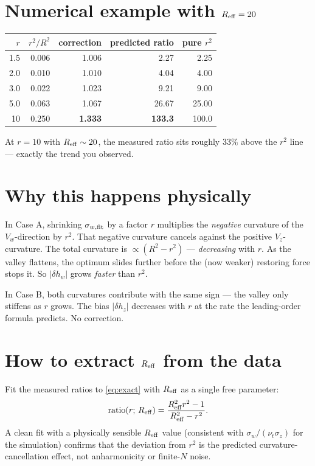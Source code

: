 \documentclass[11pt]{article}
\begin{document}
\section*{Numerical example with $R_{\rm eff}=20$}

\begin{center}
\begin{tabular}{rrrrr}
\toprule
$r$ & $r^2/R^2$ & correction & predicted ratio & pure $r^2$ \\
\midrule
1.5 & 0.006 & 1.006 &   2.27 &   2.25 \\
2.0 & 0.010 & 1.010 &   4.04 &   4.00 \\
3.0 & 0.022 & 1.023 &   9.21 &   9.00 \\
5.0 & 0.063 & 1.067 &  26.67 &  25.00 \\
10  & 0.250 & \textbf{1.333} & \textbf{133.3} & 100.0 \\
\bottomrule
\end{tabular}
\end{center}

At $r=10$ with $R_{\rm eff}\sim 20$, the measured ratio sits roughly $33\%$ above the
$r^2$ line — exactly the trend you observed.

\section*{Why this happens physically}

In Case A, shrinking $\sigma_{w,\rm fit}$ by a factor $r$ multiplies the
\emph{negative} curvature of the $V_w$-direction by $r^2$. That negative curvature
cancels against the positive $V_z$-curvature. The total curvature is
$\propto(R^2 - r^2)$ — \emph{decreasing} with $r$. As the valley flattens, the
optimum slides further before the (now weaker) restoring force stops it. So
$|\delta h_w|$ grows \emph{faster} than $r^2$.

In Case B, both curvatures contribute with the same sign — the valley only stiffens
as $r$ grows. The bias $|\delta h_z|$ decreases with $r$ at the rate the leading-order
formula predicts. No correction.

\section*{How to extract $R_{\rm eff}$ from the data}

Fit the measured ratios to \eqref{eq:exact} with $R_{\rm eff}$ as a single free
parameter:
\begin{equation}
\text{ratio}(r;\,R_{\rm eff}) = \frac{R_{\rm eff}^2 r^2 - 1}{R_{\rm eff}^2 - r^2}.
\end{equation}
A clean fit with a physically sensible $R_{\rm eff}$ value (consistent with
$\sigma_w/(\nu_t\sigma_z)$ for the simulation) confirms that the deviation from $r^2$
is the predicted curvature-cancellation effect, not anharmonicity or finite-$N$
noise.
\end{document}
